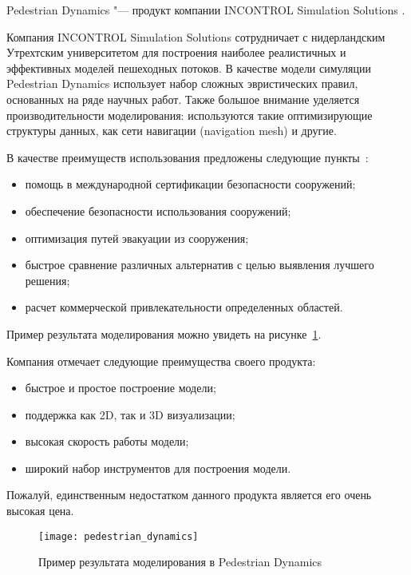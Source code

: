 \newcommand{\iss}{ IN\-CON\-TROL Si\-mu\-la\-ti\-on So\-lu\-ti\-ons }

Pedestrian Dynamics "--- продукт компании \iss.

Компания \iss сотрудничает с нидерландским Утрехтским университетом для построения наиболее реалистичных и эффективных моделей пешеходных потоков.
В качестве модели симуляции Pedestrian Dynamics использует набор сложных эвристических правил, основанных на ряде научных работ.
Также большое внимание уделяется производительности моделирования: используются такие оптимизирующие структуры данных, как сети навигации (navigation mesh) и другие.

В качестве преимуществ использования предложены следующие пункты~\cite{pedestrian_dynamics}:
\begin{itemize}
  \item помощь в международной сертификации безопасности сооружений;
  \item обеспечение безопасности использования сооружений;
  \item оптимизация путей эвакуации из сооружения;
  \item быстрое сравнение различных альтернатив с целью выявления лучшего решения;
  \item расчет коммерческой привлекательности определенных областей.
\end{itemize}

Пример результата моделирования можно увидеть на рисунке~\ref{sub:domain:analogs:pd:image_example}.

Компания отмечает следующие преимущества своего продукта:
\begin{itemize}
  \item быстрое и простое построение модели;
  \item поддержка как 2D, так и 3D визуализации;
  \item высокая скорость работы модели;
  \item широкий набор инструментов для построения модели.
\end{itemize}

Пожалуй, единственным недостатком данного продукта является его очень высокая цена.

\begin{figure}[ht!]
  \texttt{[image: pedestrian\_dynamics]}
  \caption{Пример результата моделирования в Pedestrian Dynamics}
  \label{sub:domain:analogs:pd:image_example}
\end{figure}

